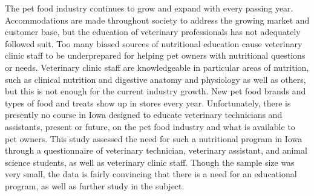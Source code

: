 
The pet food industry continues to grow and expand with every passing year. Accommodations are made throughout society to address the growing market and customer base, but the education of veterinary professionals has not adequately followed suit. Too many biased sources of nutritional education cause veterinary clinic staff to be underprepared for helping pet owners with nutritional questions or needs. Veterinary clinic staff are knowledgeable in particular areas of nutrition, such as clinical nutrition and digestive anatomy and physiology as well as others, but this is not enough for the current industry growth. New pet food brands and types of food and treats show up in stores every year. Unfortunately, there is presently no course in Iowa designed to educate veterinary technicians and assistants, present or future, on the pet food industry and what is available to pet owners. This study assessed the need for such a nutritional program in Iowa through a questionnaire of veterinary technician, veterinary assistant, and animal science students, as well as veterinary clinic staff. Though the sample size was very small, the data is fairly convincing that there is a need for an educational program, as well as further study in the subject.